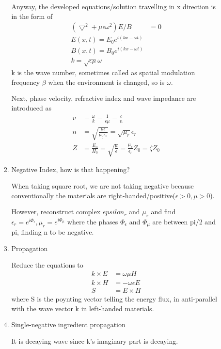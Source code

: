 \documentclass[]{article}
\begin{document}
\begin{enumerate}
\begin{enumerate}
\begin{enumerate}
			Anyway, the developed equations/solution travelling in x direction is in the form of
			\begin{align*}
				(\bigtriangledown^2 + \mu\epsilon\omega^2){E/B} &= 0\\
				E(x,t) = E_0 e^{i(kx-\omega t)}&\\
				B(x,t) = B_0 e^{i(kx-\omega t)}&\\
				k = \sqrt{\epsilon\mu}\omega&
			\end{align*}
		k is the wave number, sometimes called as spatial modulation frequency $\beta$ when the environment is changed, so is $\omega$.
		
		Next, phase velocity, refractive index and wave impedance are introduced as
		\begin{align*}
			v &= \frac{\omega}{k} = \frac{1}{\epsilon \mu} = \frac{c}{n}\\
			 n &= \sqrt{\frac{\mu\epsilon}{\mu_0\epsilon_0}} = \sqrt{\mu_r}{\epsilon_r}\\
			Z &= \frac{E_0}{H_0} = \sqrt{\frac{\mu}{\epsilon}} = \frac{\mu_r}{\epsilon_r}Z_0 = \zeta Z_0
		\end{align*}
		\item Negative Index, how is that happening?
		
		When taking square root, we are not taking negative because conventionally the materials are right-handed/positive($\epsilon>0,\mu>0$).
		
		However, reconstruct complex $epsilon_r$ and $\mu_r$ and find $\epsilon_r = e^{i\Phi_{\epsilon}}, \mu_r = e^{i\Phi_{\mu}}$ where the phases $\Phi_{\epsilon}$ and $\Phi_{\mu}$ are between pi/2 and pi, finding n to be negative.
		
		\item Propagation
		
		Reduce the equations to 
		\begin{align*}
			k \times E &= \omega \mu H\\
			k \times H &= -\omega\epsilon E\\
			S &= E \times H
		\end{align*}
		where S is the poynting vector telling the energy flux, in anti-parallel with the wave vector k in left-handed materials.
		
		\item Single-negative ingredient propagation
		
		It is decaying wave since k's imaginary part is decaying.
		\end{enumerate}
	

\end{enumerate}
\end{enumerate}
\end{document}
